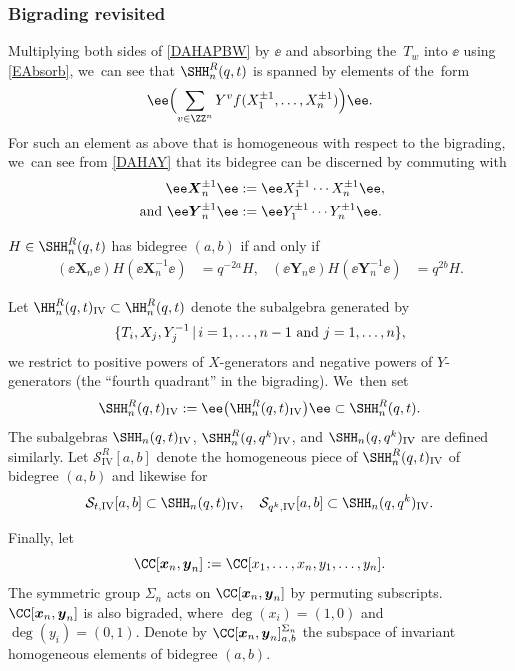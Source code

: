 \subsubsection{Bigrading revisited}\label{DAHABigrad}
Multiplying both sides of \eqref{DAHAPBW} by $\ee$ and absorbing the~$T_w$ into $\ee$ using \eqref{EAbsorb}, we~can see that $\SHH_n^R(q,t)$ is spanned by elements of the~form
\[
\ee \Bigl(\sum_{v\in\ZZ^n}Y^vf(X_1^{\pm 1},\ldots, X_n^{\pm 1})\Bigr)\ee.
\]
For such an element as above that is homogeneous with respect to the bigrading, we~can see from \eqref{DAHAY} that its bidegree can be discerned by commuting with
\begin{equation}
\begin{aligned}
\ee\boldsymbol{X}_n^{\pm1}\ee&:=\ee X_1^{\pm 1}\cdots X_n^{\pm 1}\ee,\\
\hbox{ and }\ee\boldsymbol{Y}_n^{\pm 1}\ee&:=\ee Y_1^{\pm 1}\cdots Y_n^{\pm 1}\ee.
\end{aligned}
\label{DAHADet}
\end{equation}
\begin{prop}
$H\in\SHH_n^R(q,t)$ has bidegree $(a,b)$ if and only if
\begin{align*}
\left(\ee \boldsymbol{X}_n\ee\right) H \left(\ee \boldsymbol{X}_n^{-1}\ee\right)&= q^{-2a}H,&
\left(\ee \boldsymbol{Y}_n\ee\right) H \left(\ee \boldsymbol{Y}_n^{-1}\ee\right)&= q^{2b}H.
\end{align*}
\end{prop}

Let $\HH_n^R(q,t)_{\textrm{IV}}\subset\HH_n^R(q,t)$ denote the subalgebra generated by
\[
\{T_i, X_j, Y^{-1}_j\, |\, i=1,\ldots, n-1\hbox{ and }j=1,\ldots, n\},
\]
\ie we restrict to positive powers of $X$-generators and negative powers of $Y$-generators (the ``fourth quadrant'' in the bigrading). We~then set
\[
\SHH_n^R(q,t)_{\textrm{IV}}:=\ee\bigl(\HH_n^R(q,t)_{\textrm{IV}}\bigr)\ee\subset\SHH_n^R(q,t).
\]
The subalgebras $\SHH_n(q,t)_{\mathrm{IV}}$, $\SHH_n^R(q,q^k)_{\mathrm{IV}}$, and $\SHH_n(q,q^k)_{\mathrm{IV}}$ are defined similarly.
Let $\mathcal{S}^R_{\mathrm{IV}}[a,b]$ denote the homogeneous piece of $\SHH_n^R(q,t)_{\mathrm{IV}}$ of bidegree $(a,b)$ and likewise for
\[
\mathcal{S}_{t,\mathrm{IV}}[a,b]\subset\SHH_n(q,t)_{\mathrm{IV}},\quad
\mathcal{S}_{q^k,\mathrm{IV}}[a,b]\subset\SHH_n(q,q^k)_{\mathrm{IV}}.
\]

Finally, let
\[
\CC[\boldsymbol{x}_n,\boldsymbol{y}_n]:=\CC[x_1,\ldots, x_n, y_1,\ldots, y_n].
\]
The symmetric group $\Sigma_n$ acts on $\CC[\boldsymbol{x}_n,\boldsymbol{y}_n]$ by permuting subscripts.
$\CC[\boldsymbol{x}_n,\boldsymbol{y}_n]$ is also bigraded, where $\deg(x_i)=(1,0)$ and $\deg(y_i)=(0,1)$.
Denote by $\CC[\boldsymbol{x}_n,\boldsymbol{y}_n]^{\Sigma_n}_{a,b}$ the subspace of invariant homogeneous elements of bidegree $(a,b)$.

